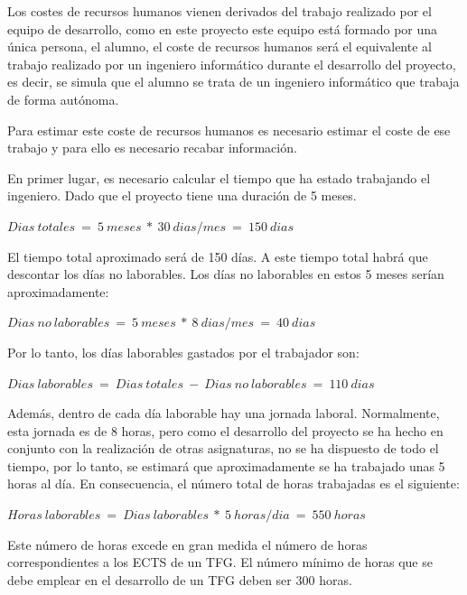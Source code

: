Los costes de recursos humanos vienen derivados del trabajo realizado por el equipo de desarrollo, como en este proyecto este equipo está formado por una única persona, el alumno, el coste de recursos humanos será el equivalente al trabajo realizado por un ingeniero informático durante el desarrollo del proyecto, es decir, se simula que el alumno se trata de un ingeniero informático que trabaja de forma autónoma.

Para estimar este coste de recursos humanos es necesario estimar el coste de ese trabajo y para ello es necesario recabar información.

En primer lugar, es necesario calcular el tiempo que ha estado trabajando el ingeniero. Dado que el proyecto tiene una duración de 5 meses.

\begin{center}
$Dias\ totales\ =\ 5\ meses\ *\ 30\ dias / mes\ =\ 150\ dias$
\end{center}

El tiempo total aproximado será de 150 días. A este tiempo total habrá que descontar los días no laborables. Los días no laborables en estos 5 meses serían aproximadamente:

\begin{center}
$Dias\ no\ laborables\ =\ 5\ meses\ *\ 8\ dias/mes\ =\ 40\ dias$
\end{center}

Por lo tanto, los días laborables gastados por el trabajador son:

\begin{center}
$Dias\ laborables\ =\ Dias\ totales\ -\ Dias\ no\ laborables\ =\ 110\ dias$
\end{center}

Además, dentro de cada día laborable hay una jornada laboral. Normalmente, esta jornada es de 8 horas, pero como el desarrollo del proyecto se ha hecho en conjunto con la realización de otras asignaturas, no se ha dispuesto de todo el tiempo, por lo tanto, se estimará que aproximadamente se ha trabajado unas 5 horas al día. En consecuencia, el número total de horas trabajadas es el siguiente:

\begin{center}
$Horas\ laborables\ =\ Dias\ laborables\ *\ 5\ horas/dia\ =\ 550\ horas$
\end{center}

Este número de horas excede en gran medida el número de horas correspondientes a los ECTS de un TFG. El número mínimo de horas que se debe emplear en el desarrollo de un TFG deben ser 300 horas.

